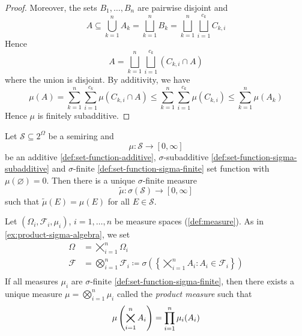 \begin{proof}
Moreover, the sets \(B_1,\dots,B_n\) are pairwise disjoint and
\begin{equation}\label{eq:A-subset-union-Cki}
A \subseteq \bigcup_{k=1}^n A_k 
= 
\bigsqcup_{k=1}^n B_k
=
\bigsqcup_{k=1}^n \bigsqcup_{i=1}^{c_k} C_{k,i}
\end{equation}
Hence
\[
A
=
\bigsqcup_{k=1}^n \bigsqcup_{i=1}^{c_k} (C_{k,i} \cap A)
\]
where the union is disjoint.
By additivity, we have
\[
\mu(A)
= %
\sum_{k=1}^n \sum_{i=1}^{c_k} \mu(C_{k,i} \cap A)
\leq %
\sum_{k=1}^n \sum_{i=1}^{c_k} \mu(C_{k,i})
\leq %
\sum_{k=1}^n \mu(A_k)
\]
Hence \(\mu\) is finitely subadditive.
\end{proof}


\begin{theorem}[\textcolor{red}{Carathéodory Extension}]\label{thm:caratheodory-extension}
Let $\mathcal{S} \subseteq 2^\Omega$ be a semiring and 
\[
\mu : \mathcal{S} \to [0,\infty]
\]
be an additive \ref{def:set-function-additive}, $\sigma$-subadditive \ref{def:set-function-sigma-subadditive} and $\sigma$-finite \ref{def:set-function-sigma-finite} set function with $\mu(\varnothing) = 0$.
Then there is a unique $\sigma$-finite measure %
\[
\tilde{\mu} : \sigma(\mathcal{S}) \to [0,\infty]
\]
such that $\tilde{\mu}(E) = \mu(E)$ for all $E \in \mathcal{S}$.
\end{theorem}

\begin{example}
\label{ex:product-measure}
Let $(\Omega_i, \mathcal{F}_i, \mu_i)$, $i = 1, \ldots, n$ be measure spaces (\autoref{def:measure}).
As in \autoref{ex:product-sigma-algebra}, we set
\[
\begin{aligned}
\Omega &= \bigtimes_{i=1}^n \Omega_i \\
\mathcal{F} &= \bigotimes_{i=1}^n \mathcal{F}_i \coloneq \sigma\left(\left\{\bigtimes_{i=1}^n A_i : A_i \in \mathcal{F}_i\right\}\right) \\
\end{aligned}
\]
If all measures $\mu_i$ are $\sigma$-finite \ref{def:set-function-sigma-finite}, then there exists a unique measure
\(
\mu = \bigotimes_{i=1}^n \mu_i %
\)
called the \emph{product measure} such that
\begin{equation}\label{eq:product-measure}
\mu\left(\bigtimes_{i=1}^n A_i\right) = \prod_{i=1}^n \mu_i(A_i)
\qedhere
\end{equation}
\end{example}

